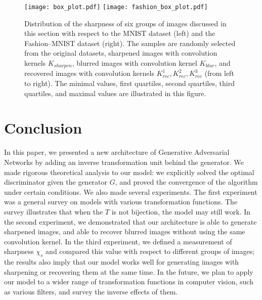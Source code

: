 \documentclass{article}
\begin{document}
\begin{figure}
\centering
\texttt{[image: box\_plot.pdf]}
\texttt{[image: fashion\_box\_plot.pdf]}
\caption{Distribution of the sharpness of six groups of images discussed in this section with respect to the MNIST dataset (left) and the Fashion--MNIST dataset (right). The samples are randomly selected from the original datasets, sharpened images with convolution kernels $K_{sharpen}$, blurred images with convolution kernel $K_{blur}$, and recovered images with convolution kernels $K_{rec}^1, K_{rec}^2, K_{rec}^3$ (from left to right). The minimal values, first quartiles, second quartiles, third quartiles, and maximal values are illustrated in this figure.}
\label{boxplot}
\end{figure}



\section{Conclusion}
In this paper, we presented a new architecture of Generative Adversarial Networks by adding an inverse transformation unit behind the generator. We made rigorous theoretical analysis to our model: we explicitly solved the optimal discriminator given the generator $G$, and proved the convergence of the algorithm under certain conditions. We also made several experiments. The first experiment was a general survey on models with various transformation functions. The survey illustrates that when the $T$ is not bijection, the model may still work. In the second experiment, we demonstrated that our architecture is able to generate sharpened images, and able to recover blurred images without using the same convolution kernel. In the third experiment, we defined a measurement of sharpness $\chi_s$ and compared this value with respect to different groups of images; the results also imply that our model works well for generating images with sharpening or recovering them at the same time. In the future, we plan to apply our model to a wider range of transformation functions in computer vision, such as various filters, and survey the inverse effects of them.
\end{document}
